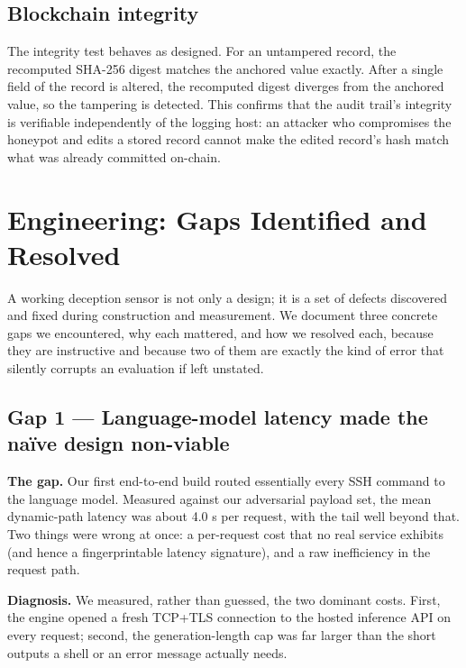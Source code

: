 \documentclass[conference]{IEEEtran}
\begin{document}
\subsection{Blockchain integrity}

The integrity test behaves as designed. For an untampered record, the recomputed SHA-256 digest matches the anchored value exactly. After a single field of the record is altered, the recomputed digest diverges from the anchored value, so the tampering is detected. This confirms that the audit trail's integrity is verifiable independently of the logging host: an attacker who compromises the honeypot and edits a stored record cannot make the edited record's hash match what was already committed on-chain.

\section{Engineering: Gaps Identified and Resolved}

A working deception sensor is not only a design; it is a set of defects discovered and fixed during construction and measurement. We document three concrete gaps we encountered, why each mattered, and how we resolved each, because they are instructive and because two of them are exactly the kind of error that silently corrupts an evaluation if left unstated.

\subsection{Gap 1 --- Language-model latency made the naïve design non-viable}

\textbf{The gap.} Our first end-to-end build routed essentially every SSH command to the language model. Measured against our adversarial payload set, the mean dynamic-path latency was about 4.0 s per request, with the tail well beyond that. Two things were wrong at once: a per-request cost that no real service exhibits (and hence a fingerprintable latency signature), and a raw inefficiency in the request path.

\textbf{Diagnosis.} We measured, rather than guessed, the two dominant costs. First, the engine opened a fresh TCP+TLS connection to the hosted inference API on every request; second, the generation-length cap was far larger than the short outputs a shell or an error message actually needs.
\end{document}

